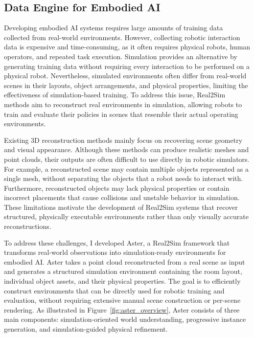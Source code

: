 \documentclass[11pt]{article}
\begin{document}
\subsection{Data Engine for Embodied AI}
\label{subsec:aster}

Developing embodied AI systems requires large amounts of training data collected from real-world environments. However, collecting robotic interaction data is expensive and time-consuming, as it often requires physical robots, human operators, and repeated task execution. Simulation provides an alternative by generating training data without requiring every interaction to be performed on a physical robot. Nevertheless, simulated environments often differ from real-world scenes in their layouts, object arrangements, and physical properties, limiting the effectiveness of simulation-based training. To address this issue, Real2Sim methods aim to reconstruct real environments in simulation, allowing robots to train and evaluate their policies in scenes that resemble their actual operating environments.

Existing 3D reconstruction methods mainly focus on recovering scene geometry and visual appearance. Although these methods can produce realistic meshes and point clouds, their outputs are often difficult to use directly in robotic simulators. For example, a reconstructed scene may contain multiple objects represented as a single mesh, without separating the objects that a robot needs to interact with. Furthermore, reconstructed objects may lack physical properties or contain incorrect placements that cause collisions and unstable behavior in simulation. These limitations motivate the development of Real2Sim systems that recover structured, physically executable environments rather than only visually accurate reconstructions.

To address these challenges, I developed Aster, a Real2Sim framework that transforms real-world observations into simulation-ready environments for embodied AI. Aster takes a point cloud reconstructed from a real scene as input and generates a structured simulation environment containing the room layout, individual object assets, and their physical properties. The goal is to efficiently construct environments that can be directly used for robotic training and evaluation, without requiring extensive manual scene construction or per-scene rendering. As illustrated in Figure~\ref{fig:aster_overview}, Aster consists of three main components: simulation-oriented world understanding, progressive instance generation, and simulation-guided physical refinement.
\end{document}
